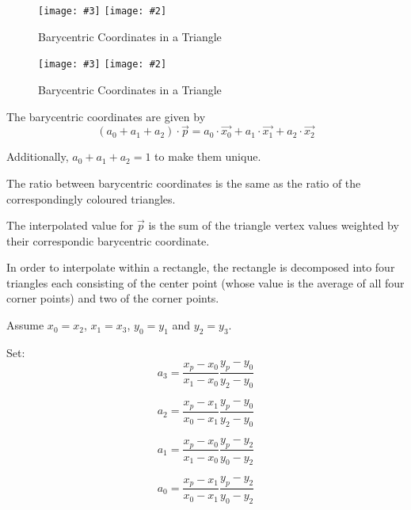 \documentclass[a4paper,10pt,pdftex]{article}
\newcommand{\jnxfig}[3][]{\ifmypdf\texttt{[image: \#3]}
  \else\texttt{[image: \#2]}\fi}
\begin{document}
\begin{figure}[!htbp]
  \begin{center}
    \jnxfig[angle=0,scale=1]{barycentric1.eps}{barycentric1.pdf}
    \caption{Barycentric Coordinates in a Triangle}
    \label{fig:barycentric1}
  \end{center}
\end{figure}

\begin{figure}[!htbp]
  \begin{center}
    \jnxfig[angle=0,scale=1]{barycentric2.eps}{barycentric2.pdf}
    \caption{Barycentric Coordinates in a Triangle}
    \label{fig:barycentric2}
  \end{center}
\end{figure}

The barycentric coordinates are given by
\begin{equation}
  (a_0+a_1+a_2)\cdot\vec{p} = a_0\cdot\vec{x_0}+a_1\cdot\vec{x_1}+a_2\cdot\vec{x_2}
\end{equation}

Additionally, $a_0+a_1+a_2=1$ to make them unique.

The ratio between barycentric coordinates is the same as the ratio of
the correspondingly coloured triangles.

The interpolated value for $\vec{p}$ is the sum of the triangle vertex
values weighted by their correspondic barycentric coordinate.

In order to interpolate within a rectangle, the rectangle is
decomposed into four triangles each consisting of the center point
(whose value is the average of all four corner points) and two of the
corner points.

Assume $x_0=x_2$, $x_1=x_3$, $y_0=y_1$ and $y_2=y_3$.

Set:
\begin{equation}
  a_3=\frac{x_p-x_0}{x_1-x_0}\frac{y_p-y_0}{y_2-y_0}
\end{equation}

\begin{equation}
  a_2=\frac{x_p-x_1}{x_0-x_1}\frac{y_p-y_0}{y_2-y_0}
\end{equation}

\begin{equation}
  a_1=\frac{x_p-x_0}{x_1-x_0}\frac{y_p-y_2}{y_0-y_2}
\end{equation}

\begin{equation}
  a_0=\frac{x_p-x_1}{x_0-x_1}\frac{y_p-y_2}{y_0-y_2}
\end{equation}
\end{document}
